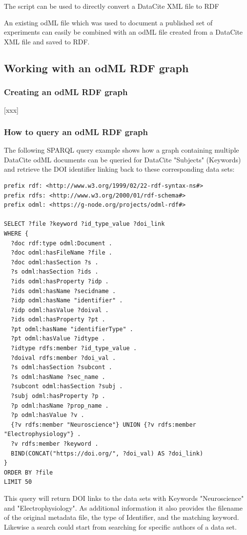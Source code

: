 \documentclass{article}
\begin{document}
The script can be used to directly convert a DataCite XML file to RDF

An existing odML file which was used to document a published set of experiments can easily be combined with an odML file created from a DataCite XML file and saved to RDF.

\subsection{Working with an odML RDF graph} \label{sec:rdf_usage}

\subsubsection{Creating an odML RDF graph} \label{sec:rdf_graph_create}
[xxx]

\subsubsection{How to query an odML RDF graph} \label{sec:rdf_graph_query}
The following SPARQL query example shows how a graph containing multiple DataCite odML documents can be queried for DataCite "Subjects" (Keywords) and retrieve the DOI identifier linking back to these corresponding data sets:

\begin{lstlisting}
prefix rdf: <http://www.w3.org/1999/02/22-rdf-syntax-ns#>
prefix rdfs: <http://www.w3.org/2000/01/rdf-schema#>
prefix odml: <https://g-node.org/projects/odml-rdf#>

SELECT ?file ?keyword ?id_type_value ?doi_link
WHERE {
  ?doc rdf:type odml:Document .
  ?doc odml:hasFileName ?file .
  ?doc odml:hasSection ?s .
  ?s odml:hasSection ?ids .
  ?ids odml:hasProperty ?idp .
  ?ids odml:hasName ?secidname .
  ?idp odml:hasName "identifier" .
  ?idp odml:hasValue ?doival .
  ?ids odml:hasProperty ?pt .
  ?pt odml:hasName "identifierType" .
  ?pt odml:hasValue ?idtype .
  ?idtype rdfs:member ?id_type_value .
  ?doival rdfs:member ?doi_val .
  ?s odml:hasSection ?subcont .
  ?s odml:hasName ?sec_name .
  ?subcont odml:hasSection ?subj .
  ?subj odml:hasProperty ?p .
  ?p odml:hasName ?prop_name .
  ?p odml:hasValue ?v .
  {?v rdfs:member "Neuroscience"} UNION {?v rdfs:member "Electrophysiology"} .
  ?v rdfs:member ?keyword .
  BIND(CONCAT("https://doi.org/", ?doi_val) AS ?doi_link)
}
ORDER BY ?file
LIMIT 50
\end{lstlisting}

This query will return DOI links to the data sets with Keywords "Neuroscience" and "Electrophysiology". As additional information it also provides the filename of the original metadata file, the type of Identifier, and the matching keyword. Likewise a search could start from searching for specific authors of a data set.
\end{document}
